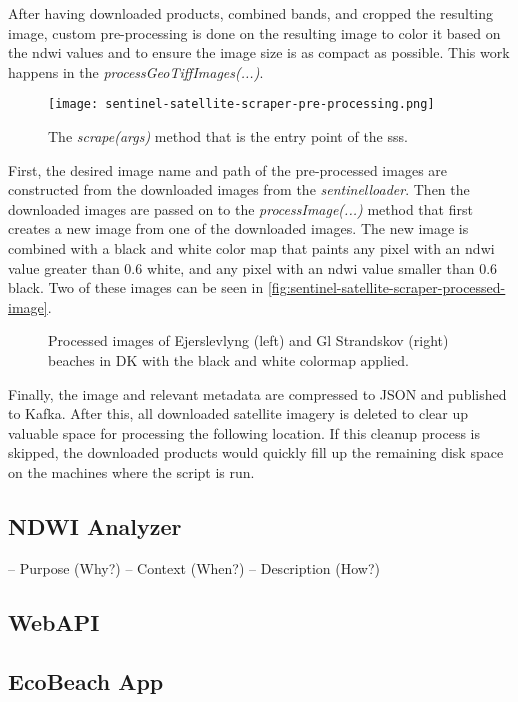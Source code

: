 After having downloaded products, combined bands, and cropped the resulting image, custom pre-processing is done on the resulting image to color it based on the \acrshort{ndwi} values and to ensure the image size is as compact as possible. This work happens in the \emph{processGeoTiffImages(...)}.

\begin{figure}[h!]
    \centering
    \texttt{[image: sentinel-satellite-scraper-pre-processing.png]}
    \caption{The \emph{scrape(args)} method that is the entry point of the \acrshort{sss}.}
    \label{fig:sentinel-satellite-scraper-pre-processing}
\end{figure}

First, the desired image name and path of the pre-processed images are constructed from the downloaded images from the \emph{sentinelloader}. Then the downloaded images are passed on to the \emph{processImage(...)} method that first creates a new image from one of the downloaded images. The new image is combined with a black and white color map that paints any pixel with an \acrshort{ndwi} value greater than 0.6 white, and any pixel with an \acrshort{ndwi} value smaller than 0.6 black. Two of these images can be seen in \autoref{fig:sentinel-satellite-scraper-processed-image}.

\begin{figure}[h!]
    \centering
    \caption{Processed images of Ejerslevlyng (left) and Gl Strandskov (right) beaches in DK with the black and white colormap applied.}
    \label{fig:sentinel-satellite-scraper-processed-image}
\end{figure}

Finally, the image and relevant metadata are compressed to JSON and published to Kafka. After this, all downloaded satellite imagery is deleted to clear up valuable space for processing the following location. If this cleanup process is skipped, the downloaded products would quickly fill up the remaining disk space on the machines where the script is run.




\subsection{NDWI Analyzer}\label{subsec:ndwi-analyzer}

– Purpose (Why?)
– Context (When?)
– Description (How?)

\subsection{WebAPI}

\subsection{EcoBeach App}\label{subsec:ecobeach-app}





